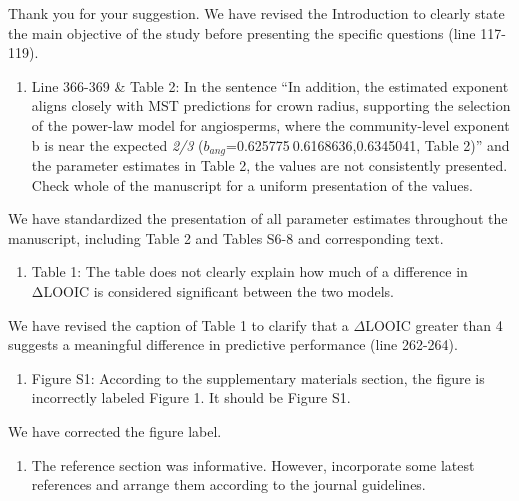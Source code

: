 \documentclass[
  12pt,
  letterpaper,
  DIV=11,
  numbers=noendperiod]{scrartcl}
\providecommand{\tightlist}{%
  \setlength{\itemsep}{0pt}\setlength{\parskip}{0pt}}\usepackage{longtable,booktabs,array}
\renewenvironment{quote}
  {\begin{customblockquote}\color{blockquote-text}\ignorespaces}
  {\end{customblockquote}}
\begin{document}
Thank you for your suggestion. We have revised the Introduction to
clearly state the main objective of the study before presenting the
specific questions (line 117-119).

\begin{quote}
\begin{enumerate}
\def\labelenumi{\arabic{enumi})}
\setcounter{enumi}{3}
\tightlist
\item
  Line 366-369 \& Table 2: In the sentence ``In addition, the estimated
  exponent aligns closely with MST predictions for crown radius,
  supporting the selection of the power-law model for angiosperms, where
  the community-level exponent b is near the expected \emph{2/3}
  (\(b_{ang}\)=0.625775 0.6168636,0.6345041, Table 2)'' and the
  parameter estimates in Table 2, the values are not consistently
  presented. Check whole of the manuscript for a uniform presentation of
  the values.
\end{enumerate}
\end{quote}

We have standardized the presentation of all parameter estimates
throughout the manuscript, including Table 2 and Tables S6-8 and
corresponding text.

\begin{quote}
\begin{enumerate}
\def\labelenumi{\arabic{enumi})}
\setcounter{enumi}{4}
\tightlist
\item
  Table 1: The table does not clearly explain how much of a difference
  in ΔLOOIC is considered significant between the two models.
\end{enumerate}
\end{quote}

We have revised the caption of Table 1 to clarify that a \(\Delta\)LOOIC
greater than 4 suggests a meaningful difference in predictive
performance (line 262-264).

\begin{quote}
\begin{enumerate}
\def\labelenumi{\arabic{enumi})}
\setcounter{enumi}{5}
\tightlist
\item
  Figure S1: According to the supplementary materials section, the
  figure is incorrectly labeled Figure 1. It should be Figure S1.
\end{enumerate}
\end{quote}

We have corrected the figure label.

\begin{quote}
\begin{enumerate}
\def\labelenumi{\arabic{enumi})}
\setcounter{enumi}{6}
\tightlist
\item
  The reference section was informative. However, incorporate some
  latest references and arrange them according to the journal
  guidelines.
\end{enumerate}
\end{quote}
\end{document}
